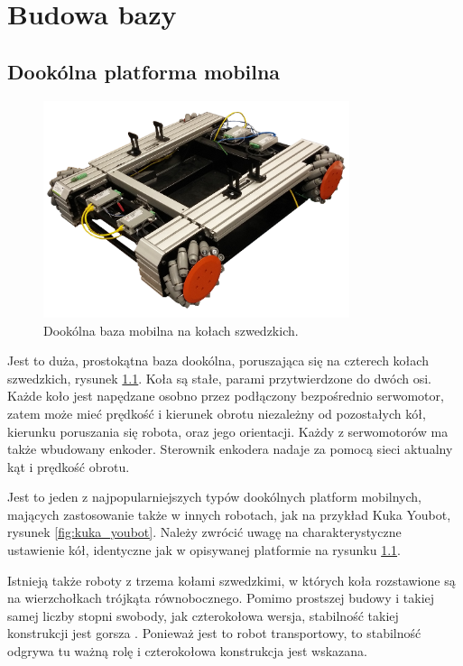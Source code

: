 \chapter{Budowa bazy}
\label{sec:robot}
\section{Dookólna platforma mobilna}
	\begin{figure}[H]
	\centering
	\includegraphics[width=0.8\textwidth]{graphics/base_photo.png}
	\caption{Dookólna baza mobilna na kołach szwedzkich.}
	\label{fig:base_photo}
	\end{figure} 

	Jest to duża, prostokątna baza dookólna, poruszająca się na czterech kołach szwedzkich, rysunek \ref{fig:base_photo}.
	Koła są stałe, parami przytwierdzone do dwóch osi.
	Każde koło jest napędzane osobno przez podłączony bezpośrednio serwomotor, 
	zatem może mieć prędkość i kierunek obrotu niezależny od pozostałych kół, kierunku poruszania się robota, oraz jego orientacji.
	Każdy z serwomotorów ma także wbudowany enkoder.
	Sterownik enkodera nadaje za pomocą sieci aktualny kąt i prędkość obrotu.

	Jest to jeden z najpopularniejszych typów dookólnych platform mobilnych, mających zastosowanie także w innych robotach, jak na przykład Kuka Youbot, rysunek \ref{fig:kuka_youbot}.
	Należy zwrócić uwagę na charakterystyczne ustawienie kół, identyczne jak w opisywanej platformie na rysunku \ref{fig:base_photo}.
	
	Istnieją także roboty z trzema kołami szwedzkimi, w których koła rozstawione są na wierzchołkach trójkąta równobocznego.
	Pomimo prostszej budowy i takiej samej liczby stopni swobody, jak czterokołowa wersja, stabilność takiej konstrukcji jest gorsza \cite{extra_axis}.
	Ponieważ jest to robot transportowy, to stabilność odgrywa tu ważną rolę i czterokołowa konstrukcja jest wskazana.


